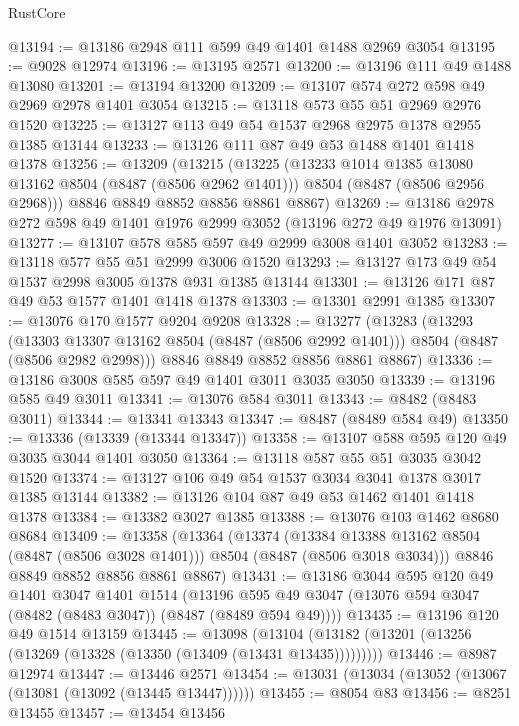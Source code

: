 \begin{lexlean}{RustCore}
\begin{coremodule}
@13194 := @13186 @2948 @111 @599 @49 @1401 @1488 @2969 @3054
@13195 := @9028 @12974
@13196 := @13195 @2571
@13200 := @13196 @111 @49 @1488 @13080
@13201 := @13194 @13200
@13209 := @13107 @574 @272 @598 @49 @2969 @2978 @1401 @3054
@13215 := @13118 @573 @55 @51 @2969 @2976 @1520
@13225 := @13127 @113 @49 @54 @1537 @2968 @2975 @1378 @2955 @1385 @13144
@13233 := @13126 @111 @87 @49 @53 @1488 @1401 @1418 @1378
@13256 := @13209
    (@13215
      (@13225
        (@13233 @1014 @1385 @13080 @13162 @8504 (@8487 (@8506 @2962 @1401)))
        @8504
        (@8487 (@8506 @2956 @2968)))
      @8846
      @8849
      @8852
      @8856
      @8861
      @8867)
@13269 := @13186 @2978 @272 @598 @49 @1401 @1976 @2999 @3052 (@13196 @272 @49 @1976 @13091)
@13277 := @13107 @578 @585 @597 @49 @2999 @3008 @1401 @3052
@13283 := @13118 @577 @55 @51 @2999 @3006 @1520
@13293 := @13127 @173 @49 @54 @1537 @2998 @3005 @1378 @931 @1385 @13144
@13301 := @13126 @171 @87 @49 @53 @1577 @1401 @1418 @1378
@13303 := @13301 @2991 @1385
@13307 := @13076 @170 @1577 @9204 @9208
@13328 := @13277
    (@13283
      (@13293
        (@13303 @13307 @13162 @8504 (@8487 (@8506 @2992 @1401)))
        @8504
        (@8487 (@8506 @2982 @2998)))
      @8846
      @8849
      @8852
      @8856
      @8861
      @8867)
@13336 := @13186 @3008 @585 @597 @49 @1401 @3011 @3035 @3050
@13339 := @13196 @585 @49 @3011
@13341 := @13076 @584 @3011
@13343 := @8482 (@8483 @3011)
@13344 := @13341 @13343
@13347 := @8487 (@8489 @584 @49)
@13350 := @13336 (@13339 (@13344 @13347))
@13358 := @13107 @588 @595 @120 @49 @3035 @3044 @1401 @3050
@13364 := @13118 @587 @55 @51 @3035 @3042 @1520
@13374 := @13127 @106 @49 @54 @1537 @3034 @3041 @1378 @3017 @1385 @13144
@13382 := @13126 @104 @87 @49 @53 @1462 @1401 @1418 @1378
@13384 := @13382 @3027 @1385
@13388 := @13076 @103 @1462 @8680 @8684
@13409 := @13358
    (@13364
      (@13374
        (@13384 @13388 @13162 @8504 (@8487 (@8506 @3028 @1401)))
        @8504
        (@8487 (@8506 @3018 @3034)))
      @8846
      @8849
      @8852
      @8856
      @8861
      @8867)
@13431 := @13186
    @3044
    @595
    @120
    @49
    @1401
    @3047
    @1401
    @1514
    (@13196 @595 @49 @3047 (@13076 @594 @3047 (@8482 (@8483 @3047)) (@8487 (@8489 @594 @49))))
@13435 := @13196 @120 @49 @1514 @13159
@13445 := @13098
    (@13104 (@13182 (@13201 (@13256 (@13269 (@13328 (@13350 (@13409 (@13431 @13435)))))))))
@13446 := @8987 @12974
@13447 := @13446 @2571
@13454 := @13031 (@13034 (@13052 (@13067 (@13081 (@13092 (@13445 @13447))))))
@13455 := @8054 @83
@13456 := @8251 @13455
@13457 := @13454 @13456

\end{coremodule}
\end{lexlean}
